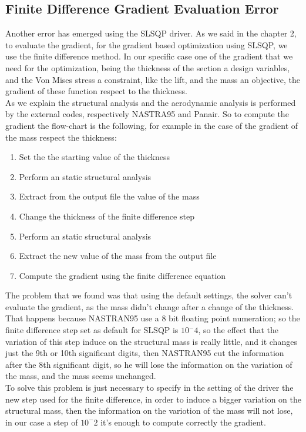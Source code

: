 \subsection{Finite Difference Gradient Evaluation Error }
Another error has emerged using the SLSQP driver. As we said in the chapter 2, to evaluate the gradient, for the gradient based optimization using SLSQP, we use the finite difference method. In our specific case one of the gradient that we need for the optimization, being the thickness of the section a design variables, and the Von Mises stress a constraint, like the lift, and the mass an objective, the gradient of these function respect to the thickness.\\
As we explain the structural analysis and the aerodynamic analysis is performed by the external codes, respectively NASTRA95 and Panair. So to compute the gradient the flow-chart is the following, for example in the case of the gradient of the mass respect the thickness:
\begin{enumerate}
	\item Set the the starting value of the thickness
	\item Perform an static structural analysis
	\item Extract from the output file the value of the mass
	\item Change the thickness of the finite difference step
	\item Perform an static structural analysis
	\item Extract the new value of the mass from the output file
	\item Compute the gradient using the finite difference equation
\end{enumerate}
The problem that we found was that using the default settings, the solver can't evaluate the gradient, as the mass didn't change after a change of the thickness. That happens because NASTRAN95 use a 8 bit floating point numeration; so the finite difference step set as default for SLSQP is $10^-4$, so the effect that the variation of this step induce on the structural mass is really little, and it changes just the 9th or 10th significant digits, then NASTRAN95 cut the information after the 8th significant digit, so he will lose the information on the variation of the mass, and the mass seems unchanged.\\
To solve this problem is just necessary to specify in the setting of the driver the new step used for the finite difference, in order to induce a bigger variation on the structural mass, then the information on the variotion of the mass will not lose, in our case a step of $10^-2$ it's enough to compute correctly the gradient.
